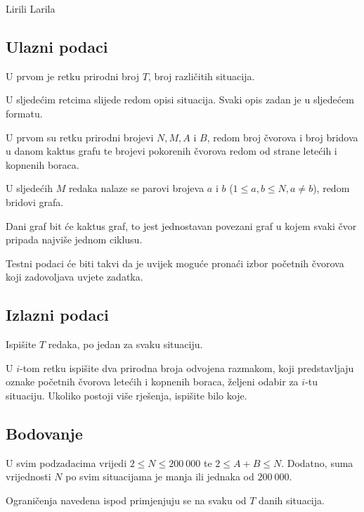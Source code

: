 \begin{statement}[
  problempoints=100,
  timelimit=3 sekunde,
  memorylimit=512 MiB,
]{Lirili Larila}
\subsection*{Ulazni podaci}

U prvom je retku prirodni broj $T$, broj različitih situacija.

U sljedećim retcima slijede redom opisi situacija. Svaki opis zadan je u sljedećem formatu.

U prvom su retku prirodni brojevi $N, M, A$ i $B$, redom broj čvorova i broj bridova 
u danom kaktus grafu te brojevi pokorenih čvorova redom od strane letećih i kopnenih boraca.

U sljedećih $M$ redaka nalaze se parovi brojeva $a$ i $b$ ($1 \leq a, b \leq N, a \ne b$), 
redom bridovi grafa. 

Dani graf bit će kaktus graf, to jest jednostavan povezani 
graf u kojem svaki čvor pripada najviše jednom ciklusu. 

Testni podaci će biti takvi da je uvijek moguće pronaći izbor početnih čvorova koji zadovoljava 
uvjete zadatka. 

\subsection*{Izlazni podaci}

Ispišite $T$ redaka, po jedan za svaku situaciju. 

U $i$-tom retku ispišite dva prirodna broja odvojena razmakom, koji 
predstavljaju oznake početnih čvorova letećih i kopnenih boraca, 
željeni odabir za $i$-tu situaciju. 
Ukoliko postoji više rješenja, ispišite bilo koje. 

\subsection*{Bodovanje}

U svim podzadacima vrijedi $2 \leq N \leq 200~000$ te $2 \leq A + B \leq N$. 
Dodatno, suma vrijednosti $N$ po svim situacijama je manja ili jednaka od $200~000$.

Ograničenja navedena ispod primjenjuju se na svaku od $T$ danih situacija. 


\end{statement}
